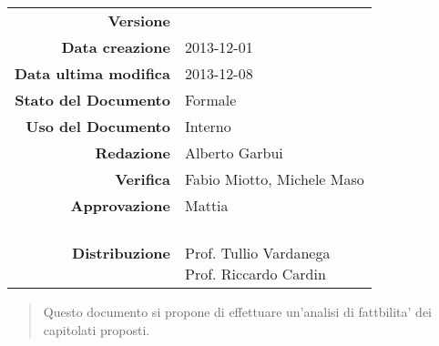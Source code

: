 


\newcommand{\Versione}{\versioneStudioDiFattibilita{}}	%
\newcommand{\Data}{2013-12-01}							%
\newcommand{\DataUltimaModifica}{2013-12-08}
\newcommand{\TipoDocumento}{Studio di Fattibilit\'a}	%




\begin{center}
\begin{tabular}{r|l}
\textbf{Versione} & \Versione{} \\
\textbf{Data creazione} & \Data{} \\
\textbf{Data ultima modifica} & \DataUltimaModifica{} \\
\textbf{Stato del Documento} & Formale \\		%
\textbf{Uso del Documento} & Interno \\			%
\textbf{Redazione} & Alberto Garbui\\			%
\textbf{Verifica} & Fabio Miotto, Michele Maso\\%
\textbf{Approvazione} & Mattia\\				%
\textbf{Distribuzione} & \parbox[t]{4cm}{\NomeGruppo{} \\ Prof. Tullio Vardanega \\ Prof. Riccardo Cardin \\ \Prop{} }\\
\end{tabular}
\end{center}

\vspace{0.05in}

\begin{abstract}
\begin{center}
Questo documento si propone di effettuare un'analisi di fattbilita' dei capitolati proposti\Prop{}.
\end{center}
\end{abstract}

